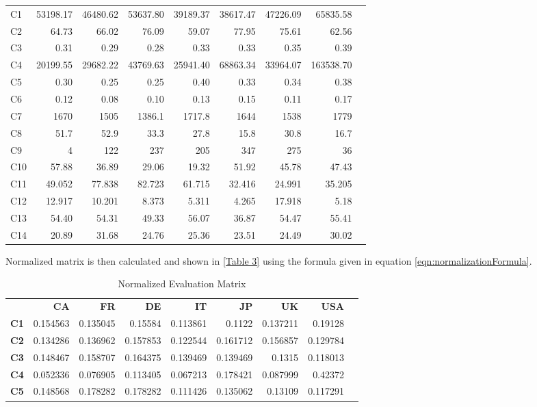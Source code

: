 \documentclass{infor}
\theoremstyle{remark}
\begin{document}
\begin{steps}
\begin{table}[!htp]
\begin{tabular}{lrrrrrrrr}
C1 & 53198.17 & 46480.62 & 53637.80 & 39189.37 & 38617.47 & 47226.09 &
65835.58\\
C2 & 64.73 & 66.02 & 76.09 & 59.07 & 77.95 & 75.61 &
62.56\\
C3 & 0.31 & 0.29 & 0.28 & 0.33 & 0.33 & 0.35 & 0.39\\
C4 & 20199.55 & 29682.22 & 43769.63 & 25941.40 & 68863.34 & 33964.07 &
163538.70\\
C5 & 0.30 & 0.25 & 0.25 & 0.40 & 0.33 & 0.34 & 0.38\\
C6 & 0.12 & 0.08 & 0.10 & 0.13 & 0.15 & 0.11 & 0.17\\
C7 & 1670 & 1505 & 1386.1 & 1717.8 & 1644 & 1538 & 1779\\
C8 & 51.7 & 52.9 & 33.3 & 27.8 & 15.8 & 30.8 & 16.7\\
C9 & 4 & 122 & 237 & 205 & 347 & 275 & 36\\
C10 & 57.88 & 36.89 & 29.06 & 19.32 & 51.92 & 45.78 &
47.43\\
C11 & 49.052 & 77.838 & 82.723 & 61.715 & 32.416 & 24.991 &
35.205\\
C12 & 12.917 & 10.201 & 8.373 & 5.311 & 4.265 & 17.918 &
5.18\\
C13 & 54.40 & 54.31 & 49.33 & 56.07 & 36.87 & 54.47 &
55.41\\
C14 & 20.89 & 31.68 & 24.76 & 25.36 & 23.51 & 24.49 &
30.02\\
\bottomrule
\end{tabular}
\end{table}
\item Normalized matrix is then calculated and shown in \autoref{Table 3} using the formula given in equation \eqref{eqn:normalizationFormula}.
\begin{table}[!htp]\centering
\caption{Normalized Evaluation Matrix}\label{Table 3}
\scriptsize
\begin{tabular}{lrrrrrrrr}\toprule
\textbf{} &\textbf{CA} &\textbf{FR} &\textbf{DE} &\textbf{IT} &\textbf{JP} &\textbf{UK} &\textbf{USA} \\\cmidrule{1-8}
\textbf{C1} &0.154563 &0.135045 &0.15584 &0.113861 &0.1122 &0.137211 &0.19128 \\
\textbf{C2} &0.134286 &0.136962 &0.157853 &0.122544 &0.161712 &0.156857 &0.129784 \\
\textbf{C3} &0.148467 &0.158707 &0.164375 &0.139469 &0.139469 &0.1315 &0.118013 \\
\textbf{C4} &0.052336 &0.076905 &0.113405 &0.067213 &0.178421 &0.087999 &0.42372 \\
\textbf{C5} &0.148568 &0.178282 &0.178282 &0.111426 &0.135062 &0.13109 &0.117291 \\

\end{tabular}
\end{table}
\end{steps}
\end{document}
